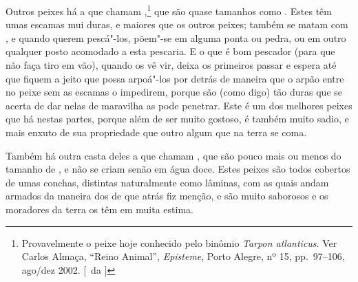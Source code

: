 Outros peixes há a que chamam ,\footnote{ Provavelmente o 
peixe hoje conhecido pelo binômio \textit{Tarpon atlanticus}. Ver Carlos Almaça, ``Reino Animal'', 
\textit{Episteme}, Porto Alegre, nº 15, pp.~97--106, ago/dez 2002. [~da ]} que são quase tamanhos como
. Estes têm umas escamas
mui duras, e maiores que os outros peixes;
também se matam com , e quando querem pescá"-los, põem"-se em alguma
ponta ou pedra, ou em outro qualquer posto acomodado a esta pescaria. E			%
o que é bom pescador (para que não faça tiro em vão), quando os vê vir, 
deixa os primeiros passar e espera até que fiquem a jeito que possa
arpoá"-los por detrás de maneira que o arpão entre no peixe sem as escamas
o impedirem, porque são (como digo) tão duras que se acerta de dar
nelas de maravilha as pode penetrar. Este é um dos melhores peixes que
há nestas partes, porque além de ser muito gostoso, é também muito
sadio, e mais enxuto de sua propriedade que outro algum que na terra se coma.

Também há outra casta deles a que chamam , que são pouco mais ou
menos do tamanho de , e não se criam senão em água doce. Estes
peixes são todos cobertos de umas conchas, distintas naturalmente como
lâminas, com as quais andam armados da maneira dos  de que atrás
fiz menção, e são muito saborosos e os moradores da terra os têm em muita estima. 

